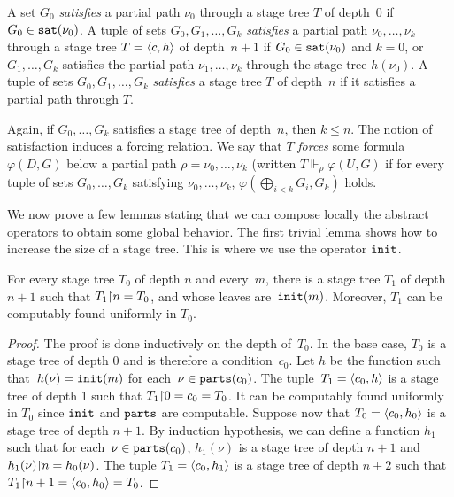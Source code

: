 \begin{definition}
A set $G_0$ \emph{satisfies} a partial path $\nu_0$ 
through a stage tree $T$ of depth~$0$ 
if $G_0 \in \mathtt{sat}(\nu_0)$.
A tuple of sets $G_0, G_1, \dots, G_k$ \emph{satisfies} a partial path $\nu_0, \dots, \nu_k$ 
through a stage tree $T = \left\langle c,h \right\rangle$ of depth~$n+1$ if $G_0 \in \mathtt{sat}(\nu_0)$
and $k = 0$, or $G_1, \dots, G_k$ satisfies the partial path $\nu_1, \dots, \nu_k$ through
the stage tree $h(\nu_0)$.
A tuple of sets $G_0, G_1, \dots, G_k$ \emph{satisfies} a stage tree $T$ of depth~$n$
if it satisfies a partial path through $T$.
\end{definition}

Again, if $G_0, \dots, G_k$ satisfies a stage tree of depth~$n$,
then $k \leq n$. The notion of satisfaction induces a forcing relation.
We say that $T$ \emph{forces} some formula $\varphi(D, G)$ below a partial path $\rho = \nu_0, \dots, \nu_k$
(written $T \Vdash_\rho \varphi(U, G)$ if for every tuple of sets $G_0, \dots, G_k$
satisfying $\nu_0, \dots, \nu_k$, $\varphi(\bigoplus_{i < k} G_i, G_k)$ holds.

We now prove a few lemmas stating that we can compose locally the abstract operators
to obtain some global behavior. The first trivial lemma shows how to increase the size of a stage tree.
This is where we use the operator $\mathtt{init}$.

\begin{lemma}\label{lem:growth-lemma}
For every stage tree $T_0$ of depth $n$ and every~$m$,
there is a stage tree $T_1$ of depth $n+1$ such that $T_1 {\upharpoonright} n = T_0$,
and whose leaves are~$\mathtt{init}(m)$.
Moreover, $T_1$ can be computably found uniformly in $T_0$.
\end{lemma}
\begin{proof}
The proof is done inductively on the depth of~$T_0$.
In the base case, $T_0$ is a stage tree of depth 0 and is therefore a condition~$c_0$.
Let $h$ be the function such that~$h(\nu) = \mathtt{init}(m)$ for each~$\nu \in \mathtt{parts}(c_0)$.
The tuple~$T_1 = \left\langle c_0, h \right\rangle$ is a stage tree of depth 1 such that $T_1 {\upharpoonright} 0 = c_0 = T_0$.
It can be computably found uniformly in $T_0$ since $\mathtt{init}$ and $\mathtt{parts}$ are computable.
Suppose now that $T_0 = \left\langle c_0, h_0 \right\rangle$ is a stage tree of depth $n+1$. By induction hypothesis,
we can define a function $h_1$ such that for each~$\nu \in \mathtt{parts}(c_0)$, $h_1(\nu)$ is a stage tree of depth $n+1$
and $h_1(\nu) {\upharpoonright} n = h_0(\nu)$. The tuple $T_1 = \left\langle c_0, h_1 \right\rangle$ is a stage tree of depth $n+2$
such that $T_1 {\upharpoonright} n+1 = \left\langle c_0, h_0 \right\rangle = T_0$.
\end{proof}

